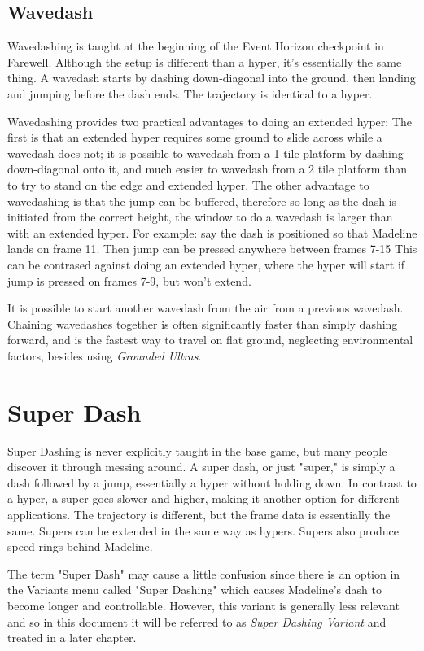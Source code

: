 \documentclass[oneside]{book}
\begin{document}
\subsection{Wavedash}

Wavedashing is taught at the beginning of the Event Horizon checkpoint in Farewell. Although the setup is different than a hyper, it's essentially the same thing. A wavedash starts by dashing down-diagonal into the ground, then landing and jumping before the dash ends. The trajectory is identical to a hyper.

Wavedashing provides two practical advantages to doing an extended hyper: The first is that an extended hyper requires some ground to slide across while a wavedash does not; it is possible to wavedash from a 1 tile platform by dashing down-diagonal onto it, and much easier to wavedash from a 2 tile platform than to try to stand on the edge and extended hyper. The other advantage to wavedashing is that the jump can be buffered, therefore so long as the dash is initiated from the correct height, the window to do a wavedash is larger than with an extended hyper. For example: say the dash is positioned so that Madeline lands on frame 11. Then jump can be pressed anywhere between frames 7-15 This can be contrased against doing an extended hyper, where the hyper will start if jump is pressed on frames 7-9, but won't extend.

It is possible to start another wavedash from the air from a previous wavedash. Chaining wavedashes together is often significantly faster than simply dashing forward, and is the fastest way to travel on flat ground, neglecting environmental factors, besides using \textit{Grounded Ultras}.

\section{Super Dash}

Super Dashing is never explicitly taught in the base game, but many people discover it through messing around. A super dash, or just "super," is simply a dash followed by a jump, essentially a hyper without holding down. In contrast to a hyper, a super goes slower and higher, making it another option for different applications. The trajectory is different, but the frame data is essentially the same. Supers can be extended in the same way as hypers. Supers also produce speed rings behind Madeline.

The term "Super Dash" may cause a little confusion since there is an option in the Variants menu called "Super Dashing" which causes Madeline's dash to become longer and controllable. However, this variant is generally less relevant and so in this document it will be referred to as \textit{Super Dashing Variant} and treated in a later chapter.
\end{document}
